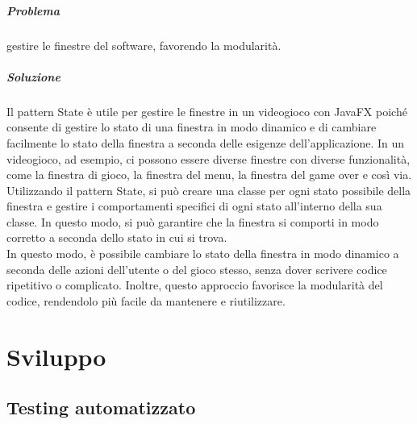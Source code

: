 \documentclass[a4paper,12pt]{report}
\begin{document}
\paragraph*{Problema} gestire le finestre del software, favorendo la modularità.
\paragraph*{Soluzione} Il pattern State è utile per gestire le finestre in un videogioco con JavaFX poiché 
consente di gestire lo stato di una finestra in modo dinamico e di cambiare facilmente lo stato della finestra a seconda delle esigenze 
dell'applicazione. In un videogioco, ad esempio, ci possono essere diverse finestre con diverse funzionalità, come la finestra di gioco, 
la finestra del menu, la finestra del game over e così via.
\\
Utilizzando il pattern State, si può creare una classe per ogni stato possibile della finestra e gestire i comportamenti specifici 
di ogni stato all'interno della sua classe. In questo modo, si può garantire che la finestra si comporti
 in modo corretto a seconda dello stato in cui si trova.
 \\
 In questo modo, è possibile cambiare lo stato della finestra in modo dinamico a seconda delle azioni dell'utente o del gioco stesso,
  senza dover scrivere codice ripetitivo o complicato. 
 Inoltre, questo approccio favorisce la modularità del codice, rendendolo più facile da mantenere e riutilizzare.


\chapter{Sviluppo}

\section{Testing automatizzato}
\end{document}

